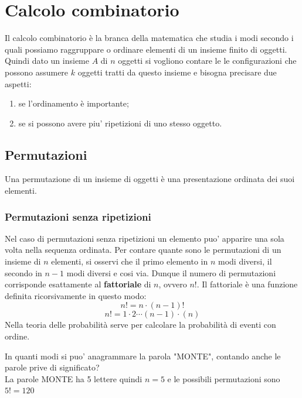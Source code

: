 \documentclass[12pt]{report}
\begin{document}
	\chapter{Calcolo combinatorio}
	Il calcolo combinatorio è la branca della matematica che studia i modi secondo i quali possiamo raggruppare o ordinare elementi di un insieme finito di oggetti. \\
	Quindi dato un insieme $A$ di $n$ oggetti si vogliono contare le le configurazioni che possono assumere $k$ oggetti tratti da questo insieme e bisogna precisare due aspetti:
	\begin{enumerate}
		\item se l'ordinamento è importante;
		\item se si possono avere piu' ripetizioni di uno stesso oggetto.
	\end{enumerate}
	\section{Permutazioni}
	Una permutazione di un insieme di oggetti è una presentazione ordinata dei suoi elementi.
	\subsection{Permutazioni senza ripetizioni}
	Nel caso di permutazioni senza ripetizioni un elemento puo' apparire una sola volta nella sequenza ordinata. Per contare quante sono le permutazioni di un insieme di $n$ elementi, si osservi che il primo elemento in $n$ modi diversi, il secondo in $n - 1$ modi diversi e cosi via. Dunque il numero di permutazioni corrisponde esattamente al \textbf{fattoriale} di $n$, ovvero $n!$.
	Il fattoriale è una funzione definita ricorsivamente in questo modo:
	\[
	n! = n \cdot (n - 1)!
	\]
	\[
	n! = 1 \cdot 2 \cdots (n - 1) \cdot (n)
	\]
	Nella teoria delle probabilità serve per calcolare la probabilità di eventi con ordine.
	\begin{example}{}{}
		In quanti modi si puo' anagrammare la parola "MONTE", contando anche le parole prive di significato? \\
		La parole MONTE ha 5 lettere quindi $n=5$ e le possibili permutazioni sono $5! = 120$
	\end{example}
\end{document}
